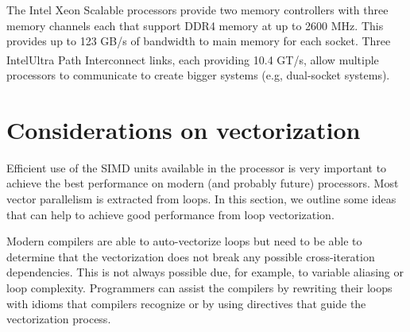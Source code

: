 \documentclass[9pt,comparison]{livecoms}
\newcommand{\rr}{\textsuperscript{\textregistered}}
\begin{document}
The Intel Xeon Scalable processors provide two memory controllers with three memory channels each that support DDR4 memory at up to 2600 MHz. This provides up to 123 GB/s of bandwidth to main memory for each socket. Three Intel\rr Ultra Path Interconnect links, each providing 10.4 GT/s, allow multiple processors to communicate to create bigger systems (e.g, dual-socket systems).

\section{Considerations on vectorization}
\label{subsection:Considerations_vecto}
\hspace{\parindent}Efficient use of the SIMD units available in the processor is very important to achieve the best performance on modern (and probably future) processors. Most vector parallelism is extracted from loops. In this section, we outline some ideas that can help to achieve good performance from loop vectorization. 

Modern compilers are able to auto-vectorize loops but need to be able to determine that the vectorization does not break any possible cross-iteration dependencies. This is not always possible due, for example, to variable aliasing or loop complexity\cite{vector-compiler}. Programmers can assist the compilers by rewriting their loops with idioms that compilers recognize or by using directives that guide the vectorization process.
\end{document}
